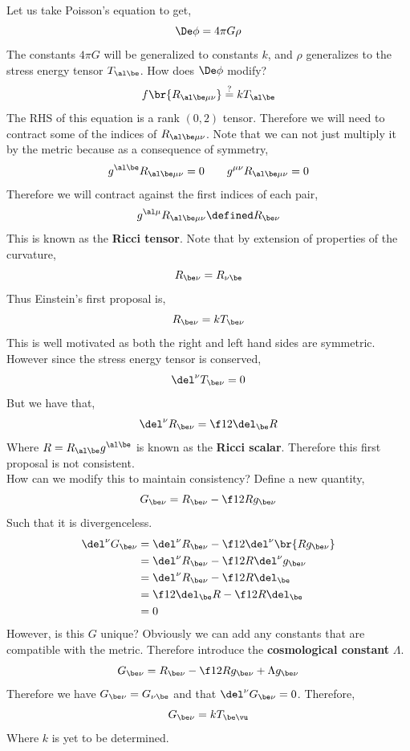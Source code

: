 \documentclass{article}
\begin{document}
Let us take Poisson's equation to get,
\[ \De \phi = 4 \pi G \rho\]
The constants $4 \pi G$ will be generalized to constants $k$, and $\rho$ generalizes to the stress energy tensor $T_{\al\be}$. How does $\De \phi$ modify?
\[ f\br{R_{\al\be\mu\nu}} \stackrel{?}{=} k T_{\al\be} \]
The RHS of this equation is a rank $(0,2)$ tensor. Therefore we will need to contract some of the indices of $R_{\al\be\mu\nu}$. Note that we can not just multiply it by the metric because as a consequence of symmetry,
\[ g^{\al\be} R_{\al\be \mu\nu} = 0 \qquad g^{\mu\nu} R_{\al\be \mu\nu} = 0 \]
Therefore we will contract against the first indices of each pair,
\[ g^{\al\mu} R_{\al\be \mu\nu} \defined R_{\be\nu}\]
This is known as the \textbf{Ricci tensor}. Note that by extension of properties of the curvature,
\[ R_{\be\nu}= R_{\nu\be} \]
Thus Einstein's first proposal is,
\[ R_{\be\nu} = k T_{\be\nu} \]
This is well motivated as both the right and left hand sides are symmetric. However since the stress energy tensor is conserved,
\[ \del^\nu T_{\be\nu} = 0 \]
But we have that,
\[ \del^\nu R_{\be\nu} = \f12 \del_\be R \]
Where $R = R_{\al\be} g^{\al\be}$ is known as the \textbf{Ricci scalar}. Therefore this first proposal is not consistent.\\

How can we modify this to maintain consistency? Define a new quantity,
\[ G_{\be\nu} = R_{\be\nu} - \f12 R g_{\be\nu} \]
Such that it is divergenceless.
\begin{align*}
\del^\nu G_{\be\nu} &= \del^\nu R_{\be\nu} - \f12 \del^\nu \br{R g_{\be\nu}}\\
&= \del^\nu R_{\be\nu} - \f12 R\del^\nu  g_{\be\nu}\\
&= \del^\nu R_{\be\nu} - \f12 R\del_\be \\
&= \f12 \del_\be R - \f12 R\del_\be \\
&= 0 \\
\end{align*}
However, is this $G$ unique? Obviously we can add any constants that are compatible with the metric. Therefore introduce the \textbf{cosmological constant} $\Lambda$.
\[ G_{\be\nu} = R_{\be\nu} - \f12 R g_{\be\nu}  + \Lambda g_{\be\nu}\]
Therefore we have $G_{\be\nu} = G_{\nu\be}$ and that $\del^\nu G_{\be\nu} = 0$. Therefore,
\[ G_{\be\nu} = k T_{\be\vu} \]
Where $k$ is yet to be determined.\\
\end{document}
